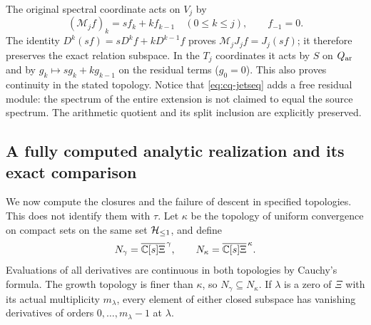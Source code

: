 The original spectral coordinate acts on $V_j$ by
\[
 (\mathcal M_j f)_k=s f_k+k f_{k-1}\quad(0\leq k\leq j),
 \qquad f_{-1}=0.
\]
The identity $D^k(sf)=sD^kf+kD^{k-1}f$ proves
$\mathcal M_jJ_jf=J_j(sf)$; it therefore preserves the exact
relation subspace. In the $T_j$ coordinates it acts by $S$ on
$Q_{\rm ar}$ and by $g_k\mapsto sg_k+kg_{k-1}$ on the residual terms
($g_0=0$). This also proves continuity in the stated topology.
Notice that \eqref{eq:cq-jetseq} adds a free residual module:
the spectrum of the entire extension is not claimed to equal the
source spectrum. The arithmetic quotient and its split inclusion
are explicitly preserved.

\subsection{A fully computed analytic realization and its exact comparison}
\label{sec:cq-analytic}
We now compute the closures and the failure of descent in specified
topologies. This does not identify them with $\tau$.
Let $\kappa$ be the topology of uniform convergence on compact sets
on the same set $\mathcal H_{\leq 1}$, and define
\[
 N_\gamma=\overline{\mathbb C[s]\Xi}^{\,\gamma},\qquad
 N_\kappa=\overline{\mathbb C[s]\Xi}^{\,\kappa}.
\]
Evaluations of all derivatives are continuous in both topologies by
Cauchy's formula. The growth topology is finer than $\kappa$, so
$N_\gamma\subseteq N_\kappa$.
If $\lambda$ is a zero of $\Xi$ with its actual multiplicity $m_\lambda$,
every element of either closed subspace has vanishing derivatives
of orders $0,\ldots,m_\lambda-1$ at $\lambda$.

